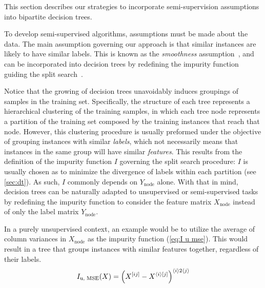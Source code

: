 This section describes our strategies to incorporate semi-supervision assumptions into bipartite decision trees.

To develop semi-supervised algorithms, assumptions must be made about the data. The main assumption governing our approach is that similar instances are likely to have similar labels. This is known as the \emph{smoothness} assumption~\cite{chapelle2006semisupervised,vanengelen2020survey}, and can be incorporated into decision trees by redefining the impurity function guiding the split search~\cite{levatic2017semisupervised,adiyeke2022semisupervised,alves2023semisupervised}.

Notice that the growing of decision trees unavoidably induces groupings of samples in the training set. 
Specifically, the structure of each tree represents a hierarchical clustering of the training samples, in which each tree node represents a partition of the training set composed by the training instances that reach that node.
%
However, this clustering procedure is usually preformed under the objective of grouping instances with similar \emph{labels}, which not necessarily means that instances in the same group will have similar \emph{features}.
%
This results from the definition of the impurity function $I$ governing the split search procedure: $I$ is usually chosen as to minimize the divergence of labels within each partition (see \autoref{sec:dt}). As such, $I$ commonly depends on $Y_\text{node}$ alone.
%
With that in mind, decision trees can be naturally adapted to unsupervised or semi-supervised tasks by redefining the impurity function to consider the feature matrix $X_\text{node}$ instead of only the label matrix $Y_\text{node}$.

In a purely unsupervised context, an example would be to utilize the average of column variances in $X_\text{node}$ as the impurity function (\autoref{eq:I u mse}). This would result in a tree that groups instances with similar features together, regardless of their labels.
%
\begin{equation}
    I_\text{u, MSE}(X) = \left( X^{[ij]} - X^{\langle i\rangle[j]} \right)^{\langle i\rangle2\langle j\rangle}
    \label{eq:I u mse}
\end{equation}

